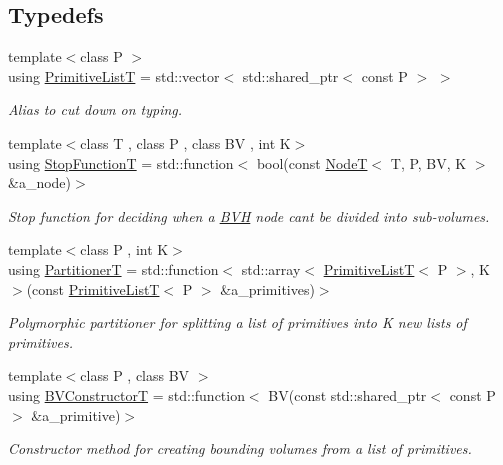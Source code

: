 \subsection*{Typedefs}
\begin{DoxyCompactItemize}
\item 
{\footnotesize template$<$class P $>$ }\\using \hyperlink{namespaceBVH_aa1e753bda451b85cd5b948722a2ad7c7}{Primitive\+ListT} = std\+::vector$<$ std\+::shared\+\_\+ptr$<$ const P $>$ $>$
\begin{DoxyCompactList}\small\item\em Alias to cut down on typing. \end{DoxyCompactList}\item 
{\footnotesize template$<$class T , class P , class BV , int K$>$ }\\using \hyperlink{namespaceBVH_afef1c5979c34a11d23b756cc09654bf9}{Stop\+FunctionT} = std\+::function$<$ bool(const \hyperlink{classBVH_1_1NodeT}{NodeT}$<$ T, P, BV, K $>$ \&a\+\_\+node)$>$
\begin{DoxyCompactList}\small\item\em Stop function for deciding when a \hyperlink{namespaceBVH}{B\+VH} node can\textquotesingle{}t be divided into sub-\/volumes. \end{DoxyCompactList}\item 
{\footnotesize template$<$class P , int K$>$ }\\using \hyperlink{namespaceBVH_a7c33d54da9893d506709b2ca96b76f55}{PartitionerT} = std\+::function$<$ std\+::array$<$ \hyperlink{namespaceBVH_aa1e753bda451b85cd5b948722a2ad7c7}{Primitive\+ListT}$<$ P $>$, K $>$(const \hyperlink{namespaceBVH_aa1e753bda451b85cd5b948722a2ad7c7}{Primitive\+ListT}$<$ P $>$ \&a\+\_\+primitives)$>$
\begin{DoxyCompactList}\small\item\em Polymorphic partitioner for splitting a list of primitives into K new lists of primitives. \end{DoxyCompactList}\item 
{\footnotesize template$<$class P , class BV $>$ }\\using \hyperlink{namespaceBVH_a245702d7eff40cdaedb5dff68c25a88a}{B\+V\+ConstructorT} = std\+::function$<$ BV(const std\+::shared\+\_\+ptr$<$ const P $>$ \&a\+\_\+primitive)$>$
\begin{DoxyCompactList}\small\item\em Constructor method for creating bounding volumes from a list of primitives. \end{DoxyCompactList}\end{DoxyCompactItemize}
